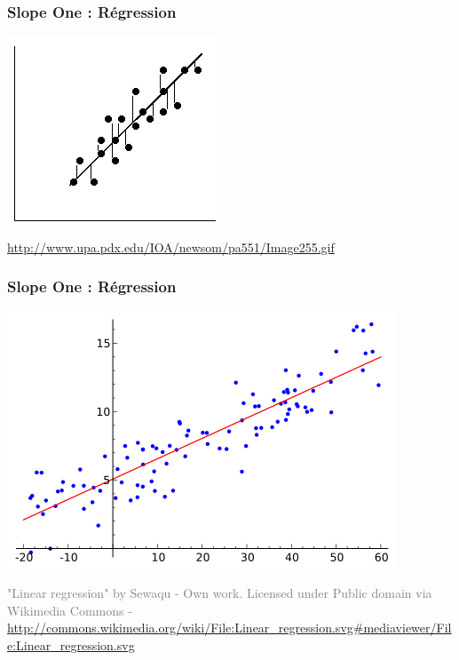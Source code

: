 \documentclass[t]{beamer}
\newcommand\gray[1]{\textcolor{gray}{#1}}
\begin{document}
\begin{frame}
  \frametitle{Slope One : Régression}

  \vspace{1cm}
  \centerline{\includegraphics[height=.4\textheight]{regression.png}}

  \vspace{1cm}
  \centerline{\gray{\footnotesize \url{http://www.upa.pdx.edu/IOA/newsom/pa551/Image255.gif}}}
  
\end{frame}

\begin{frame}
  \frametitle{Slope One : Régression}
  
  \vspace{1cm}
  \centerline{\includegraphics[height=.4\textheight]{linear-regression.png}}

  \vspace{1cm}
  \gray{\small "Linear regression" by Sewaqu - Own work. Licensed
    under Public domain via Wikimedia Commons -
    {\footnotesize\url{http://commons.wikimedia.org/wiki/File:Linear\_regression.svg\#mediaviewer/File:Linear_regression.svg}}}

\end{frame}
\end{document}

